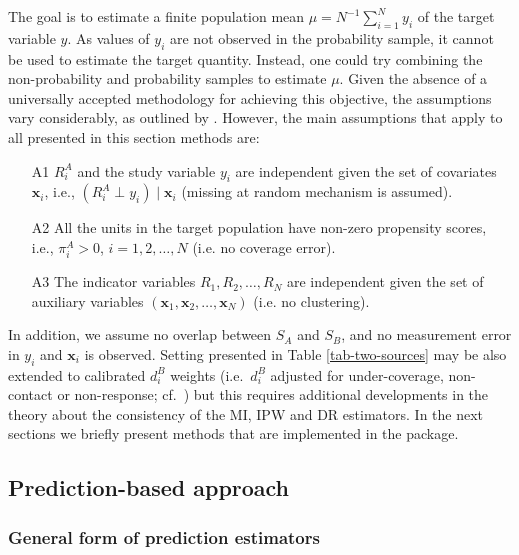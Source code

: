 \documentclass[
]{jss}
\begin{document}
The goal is to estimate a finite population mean
\(\mu=N^{-1}\sum_{i=1}^{N} y_{i}\) of the target variable \(y\). As
values of \(y_{i}\) are not observed in the probability sample, it
cannot be used to estimate the target quantity. Instead, one could try
combining the non-probability and probability samples to estimate
\(\mu\). Given the absence of a universally accepted methodology for
achieving this objective, the assumptions vary considerably, as outlined
by \citet{wu2022statistical}. However, the main assumptions that apply
to all presented in this section methods are:

\begin{itemize}
\item[A1] $R_i^A$ and the study variable $y_i$ are independent given the set of covariates $\boldsymbol{x}_i$, i.e., $\left(R_i^A \perp y_i\right) \mid \boldsymbol{x}_i$ (missing at random mechanism is assumed).
\item[A2] All the units in the target population have non-zero propensity scores, i.e., $\pi_i^A>0$, $i=1,2, \ldots, N$ (i.e. no coverage error).
\item[A3] The indicator variables $R_1, R_2, \ldots, R_N$ are independent given the set of auxiliary variables $\left(\boldsymbol{x}_1, \boldsymbol{x}_2, \ldots, \boldsymbol{x}_N\right)$ (i.e. no clustering).
\end{itemize}

In addition, we assume no overlap between \(S_A\) and \(S_B\), and no
measurement error in \(y_i\) and \(\boldsymbol{x}_i\) is observed.
Setting presented in Table \ref{tab-two-sources} may be also extended to
calibrated \(d_i^B\) weights (i.e.~\(d_i^B\) adjusted for
under-coverage, non-contact or non-response;
cf.~\cite{sarndal2005estimation}) but this requires additional
developments in the theory about the consistency of the MI, IPW and DR
estimators. In the next sections we briefly present methods that are
implemented in the package.

\subsection{Prediction-based approach}\label{sec-prediction}

\subsubsection{General form of prediction
estimators}\label{general-form-of-prediction-estimators}
\end{document}
